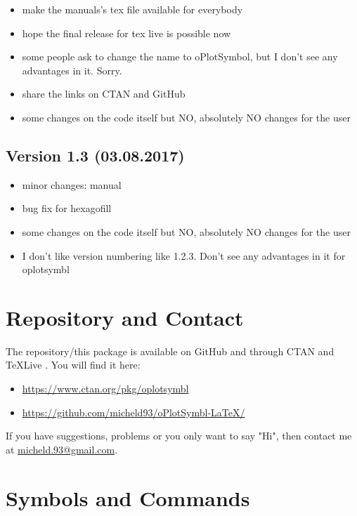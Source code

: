 \documentclass[
	a4paper,
	parskip=half,
    pagesize=auto,      		%
    listof=totoc,   		%
    bibliography=totoc,
	11pt
]{scrartcl}
\begin{document}
\begin{itemize}
    \item make the manuals's tex file available for everybody
    \item hope the final release for tex live is possible now
    \item some people ask to change the name to oPlotSymbol, but I don't see any advantages in it. Sorry.
    \item share the links on CTAN and GitHub
    \item some changes on the code itself but NO, absolutely NO changes for the user 
\end{itemize}


\subsection{Version 1.3 (03.08.2017)}

\begin{itemize}
    \item minor changes: manual
    \item bug fix for hexagofill
    \item some changes on the code itself but NO, absolutely NO changes for the user 
    \item I don't like version numbering like 1.2.3. Don't see any advantages in it for oplotsymbl
\end{itemize}


\section{Repository and Contact}

The repository/this package is available on GitHub and through CTAN \cite{ctan} and TeXLive \cite{texlive}. You will find it here:


\begin{itemize}
    \item \url{https://www.ctan.org/pkg/oplotsymbl}
    \item \url{https://github.com/micheld93/oPlotSymbl-LaTeX/}  
\end{itemize}


If you have suggestions, problems or you only want to say "Hi", then contact me at \href{mailto:micheld.93@ gmail.com}{micheld.93@gmail.com}.


\section{Symbols and Commands}
\end{document}
